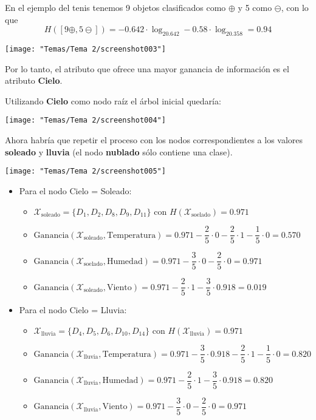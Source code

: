 En el ejemplo del tenis tenemos 9 objetos clasificados como $\oplus$ y 5 como $\ominus$, con lo que \[ H([9\oplus,5\ominus])=-0.642\cdot\log_20.642-0.58\cdot\log_20.358=0.94 \]
\begin{center}
	\texttt{[image: "Temas/Tema 2/screenshot003"]}
\end{center}
Por lo tanto, el atributo que ofrece una mayor ganancia de información es el atributo \textbf{Cielo}.

Utilizando \textbf{Cielo} como nodo raíz el árbol inicial quedaría:
\begin{center}
	\texttt{[image: "Temas/Tema 2/screenshot004"]}
\end{center}
\begin{minipage}{0.45 \textwidth}
	Ahora habría que repetir el proceso con los nodos correspondientes a los valores \textbf{soleado} y \textbf{lluvia} (el nodo \textbf{nublado} sólo contiene una clase).
\end{minipage}\qquad\begin{minipage}{0.45\textwidth}
\begin{center}
	\texttt{[image: "Temas/Tema 2/screenshot005"]}
\end{center}
\end{minipage}

\begin{itemize}
	\item Para el nodo Cielo = Soleado:
	\begin{itemize}
		\item $\mathcal{X}_{\mathrm{soleado}}=\{D_1,D_2,D_8,D_9,D_11\}$ con $H(\mathcal{X}_{\mathrm{soelado}})=0.971$
		\item $\mathrm{Ganancia}(\mathcal{X}_{\mathrm{soleado}},\mathrm{Temperatura})=0.971-\dfrac{2}{5}\cdot0-\dfrac{2}{5}\cdot1-\dfrac{1}{5}\cdot0=0.570$
		\item $\mathrm{Ganancia}(\mathcal{X}_{\mathrm{soelado}},\mathrm{Humedad})=0.971-\dfrac{3}{5}\cdot0-\dfrac{2}{5}\cdot0=0.971$
		\item $\mathrm{Ganancia}(\mathcal{X}_{\mathrm{soleado}},\mathrm{Viento})=0.971-\dfrac{2}{5}\cdot1-\dfrac{3}{5}\cdot0.918=0.019$
	\end{itemize}
	\item Para el nodo Cielo = Lluvia:
	\begin{itemize}
		\item $\mathcal{X}_{\mathrm{lluvia}}=\{D_4,D_5,D_6,D_{10},D_{14}\}$ con $H(\mathcal{X}_{\mathrm{lluvia}})=0.971$
		\item $\mathrm{Ganancia}(\mathcal{X}_{\mathrm{lluvia}},\mathrm{Temperatura})=0.971-\dfrac{3}{5}\cdot0.918-\dfrac{2}{5}\cdot1-\dfrac{1}{5}\cdot0=0.820$
		\item $\mathrm{Ganancia}(\mathcal{X}_{\mathrm{lluvia}},\mathrm{Humedad})=0.971-\dfrac{2}{5}\cdot1-\dfrac{3}{5}\cdot0.918=0.820$
		\item $\mathrm{Ganancia}(\mathcal{X}_{\mathrm{lluvia}},\mathrm{Viento})=0.971-\dfrac{3}{5}\cdot0-\dfrac{2}{5}\cdot0=0.971$
	\end{itemize}
\end{itemize}

